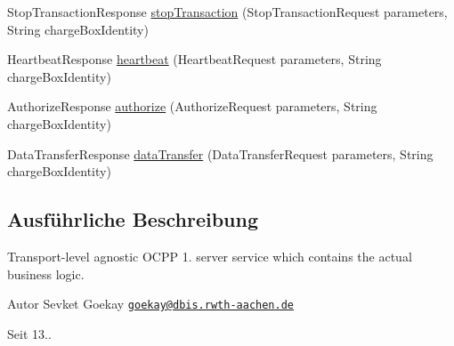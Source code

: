 \begin{DoxyCompactItemize}
\item 
Stop\-Transaction\-Response \hyperlink{classde_1_1rwth_1_1idsg_1_1steve_1_1service_1_1_central_system_service15___service_aa547b40f44cb1db8aea33116facf772e}{stop\-Transaction} (Stop\-Transaction\-Request parameters, String charge\-Box\-Identity)
\item 
Heartbeat\-Response \hyperlink{classde_1_1rwth_1_1idsg_1_1steve_1_1service_1_1_central_system_service15___service_a0ff1bb73a2fc212f929598e1cae54d3c}{heartbeat} (Heartbeat\-Request parameters, String charge\-Box\-Identity)
\item 
Authorize\-Response \hyperlink{classde_1_1rwth_1_1idsg_1_1steve_1_1service_1_1_central_system_service15___service_a8597819f2220a6966a337d7a1d030285}{authorize} (Authorize\-Request parameters, String charge\-Box\-Identity)
\item 
Data\-Transfer\-Response \hyperlink{classde_1_1rwth_1_1idsg_1_1steve_1_1service_1_1_central_system_service15___service_af91f0db063936519a866dd1f6fc80004}{data\-Transfer} (Data\-Transfer\-Request parameters, String charge\-Box\-Identity)
\end{DoxyCompactItemize}


\subsection{Ausführliche Beschreibung}
Transport-\/level agnostic O\-C\-P\-P 1. server service which contains the actual business logic.

\begin{DoxyAuthor}{Autor}
Sevket Goekay \href{mailto:goekay@dbis.rwth-aachen.de}{\tt goekay@dbis.\-rwth-\/aachen.\-de} 
\end{DoxyAuthor}
\begin{DoxySince}{Seit}
13.. 
\end{DoxySince}


